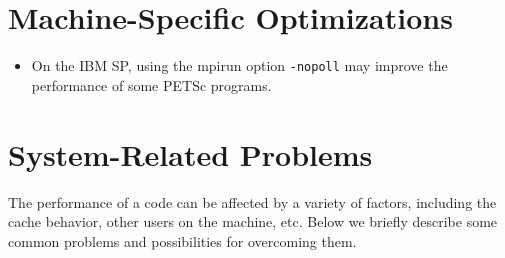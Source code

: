 {\section{Machine-Specific Optimizations}

\begin{itemize}
\item On the IBM SP, using the mpirun option {\tt -nopoll} may
      improve the performance of some PETSc programs.
\end{itemize}

\section{System-Related Problems}

The performance of a code can be affected by a variety of factors, 
including the cache behavior, other users on the machine, etc.
Below we briefly describe some common problems and possibilities for
overcoming them.

}
